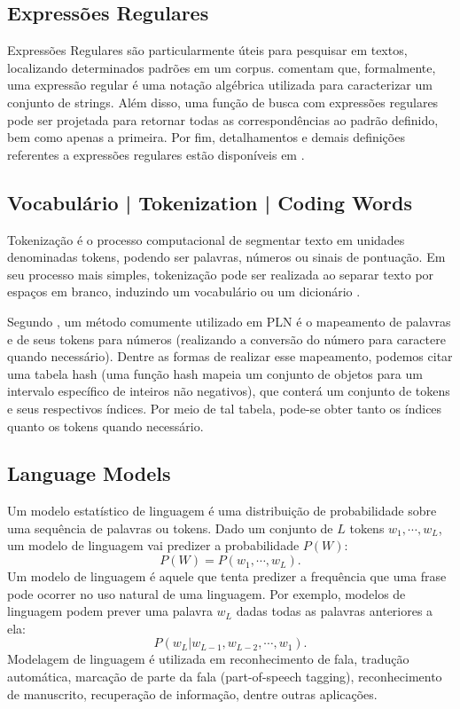 \documentclass{automatextcc}
\begin{document}
\subsection{Expressões Regulares}
Expressões Regulares são particularmente úteis para pesquisar em textos, localizando determinados padrões em um corpus. \citet{jurafsky2021} comentam que, formalmente, uma expressão regular é uma notação algébrica utilizada para caracterizar um conjunto de strings. Além disso, uma função de busca com expressões regulares pode ser projetada para retornar todas as correspondências ao padrão definido, bem como apenas a primeira. Por fim, detalhamentos e demais definições referentes a expressões regulares estão disponíveis em \citet{jurafsky2021}.


\subsection{Vocabulário | Tokenization | Coding Words}
Tokenização é o processo computacional de segmentar texto em unidades denominadas tokens, podendo ser palavras, números ou sinais de pontuação. Em seu processo mais simples, tokenização pode ser realizada ao separar texto por espaços em branco, induzindo um vocabulário ou um dicionário \citep{kamath2019, jurafsky2021}.

Segundo \citet{manning1999}, um método comumente utilizado em PLN é o mapeamento de palavras e de seus tokens para números (realizando a conversão do número para caractere quando necessário). Dentre as formas de realizar esse mapeamento, podemos citar uma tabela hash (uma função hash mapeia um conjunto de objetos para um intervalo específico de inteiros não negativos), que conterá um conjunto de tokens e seus respectivos índices. Por meio de tal tabela, pode-se obter tanto os índices quanto os tokens quando necessário.


\subsection{Language Models}
Um modelo estatístico de linguagem é uma distribuição de probabilidade sobre uma sequência de palavras ou tokens. Dado um conjunto de $L$ tokens $w_1,\cdots,w_L$, um modelo de linguagem vai predizer a probabilidade $P(W)$: 
\begin{equation*}
    P(W) = P(w_1,\cdots,w_L).
\end{equation*}
Um modelo de linguagem é aquele que tenta predizer a frequência que uma frase pode ocorrer no uso natural de uma linguagem. Por exemplo, modelos de linguagem podem prever uma palavra $w_L$ dadas todas as palavras anteriores a ela:
\begin{equation*}
    P(w_L | w_{L-1},w_{L-2},\cdots,w_1).
\end{equation*}
Modelagem de linguagem é utilizada em reconhecimento de fala, tradução automática, marcação de parte da fala (part-of-speech tagging), reconhecimento de manuscrito, recuperação de informação, dentre outras aplicações. 
\citep{kamath2019, jurafsky2021}
\end{document}
